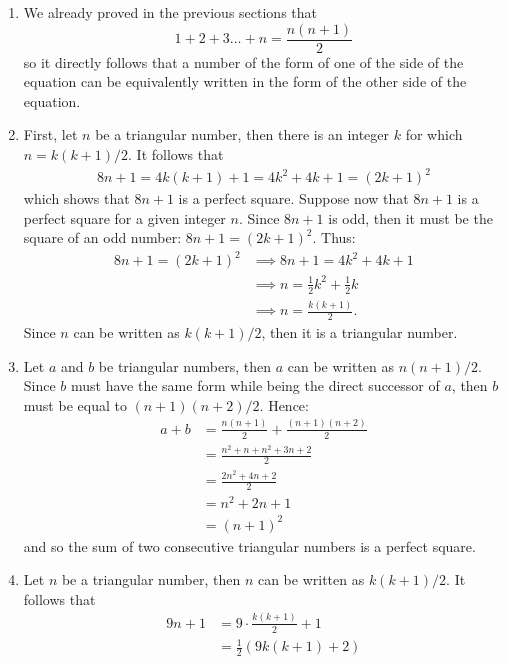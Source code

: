 \begin{solution}
    \begin{enumerate}
        \item We already proved in the previous sections that
        $$1 + 2 + 3 \dots + n = \frac{n(n+1)}{2}$$
        so it directly follows that a number of the form of one of the side of the equation can be equivalently written in the form of the other side of the equation.
        \item  First, let $n$ be a triangular number, then there is an integer $k$ for which $n = k(k+1)/2$. It follows that
        \begin{align*}
            8n+1 = 4k(k+1) + 1 = 4k^2 + 4k + 1 = (2k+1)^2
        \end{align*}
        which shows that $8n+1$ is a perfect square. Suppose now that $8n+1$ is a perfect square for a given integer $n$. Since $8n+1$ is odd, then it must be the square of an odd number: $8n+1 = (2k+1)^2$. Thus:
        \begin{align*}
            8n+1 = (2k + 1)^2 &\implies 8n+1 = 4k^2 + 4k + 1 \\
            &\implies n = \frac{1}{2}k^2 + \frac{1}{2}k \\
            &\implies n = \frac{k(k+1)}{2}.
        \end{align*}
        Since $n$ can be written as $k(k+1)/2$, then it is a triangular number.
        \item Let $a$ and $b$ be triangular numbers, then $a$ can be written as $n(n+1)/2$. Since $b$ must have the same form while being the direct successor of $a$, then $b$ must be equal to $(n+1)(n+2)/2$. Hence:
        \begin{align*}
            a + b &= \frac{n(n+1)}{2} + \frac{(n+1)(n+2)}{2} \\
            &= \frac{n^2 + n + n^2 + 3n + 2}{2} \\
            &= \frac{2n^2 + 4n + 2}{2} \\
            &= n^2 + 2n + 1 \\
            &= (n+1)^2
        \end{align*}
        and so the sum of two consecutive triangular numbers is a perfect square.
        \item Let $n$ be a triangular number, then $n$ can be written as $k(k+1)/2$. It follows that
        \begin{align*}
            9n+1 &= 9\cdot \frac{k(k+1)}{2} + 1 \\
            &= \frac{1}{2}(9k(k+1) + 2) \\

\end{align*}
\end{enumerate}
\end{solution}
